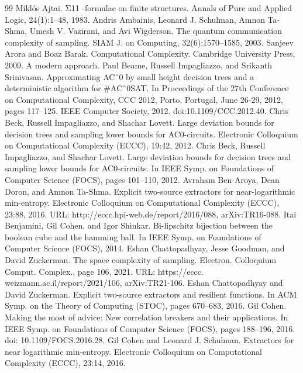 \documentclass[10pt,a4paper]{article}
\begin{document}
\begin{thebibliography}{99}
 Miklós Ajtai. Σ11 -formulae on finite structures. Annals of Pure and Applied Logic, 24(1):1–48, 1983.
 Andris Ambainis, Leonard J. Schulman, Amnon Ta-Shma, Umesh V. Vazirani, and Avi Wigderson. The quantum communication complexity of sampling. SIAM J. on Computing, 32(6):1570–1585, 2003.
 Sanjeev Arora and Boaz Barak. Computational Complexity. Cambridge University Press, 2009. A modern approach.
 Paul Beame, Russell Impagliazzo, and Srikanth Srinivasan. Approximating ACˆ0 by small height decision trees and a deterministic algorithm for \#ACˆ0SAT. In Proceedings of the 27th Conference on Computational Complexity, CCC 2012, Porto, Portugal, June 26-29, 2012, pages 117–125. IEEE Computer Society, 2012. doi:10.1109/CCC.2012.40.
 Chris Beck, Russell Impagliazzo, and Shachar Lovett. Large deviation bounds for decision trees and sampling lower bounds for AC0-circuits. Electronic Colloquium on Computational Complexity (ECCC), 19:42, 2012.
 Chris Beck, Russell Impagliazzo, and Shachar Lovett. Large deviation bounds for decision trees and sampling lower bounds for AC0-circuits. In IEEE Symp. on Foundations of Computer Science (FOCS), pages 101–110, 2012.
 Avraham Ben-Aroya, Dean Doron, and Amnon Ta-Shma. Explicit two-source extractors for near-logarithmic min-entropy. Electronic Colloquium on Computational Complexity (ECCC), 23:88, 2016. URL: http://eccc.hpi-web.de/report/2016/088, arXiv:TR16-088.
 Itai Benjamini, Gil Cohen, and Igor Shinkar. Bi-lipschitz bijection between the boolean cube and the hamming ball. In IEEE Symp. on Foundations of Computer Science (FOCS), 2014.
 Eshan Chattopadhyay, Jesse Goodman, and David Zuckerman. The space complexity of sampling. Electron. Colloquium Comput. Complex., page 106, 2021. URL: https://eccc. weizmann.ac.il/report/2021/106, arXiv:TR21-106.
 Eshan Chattopadhyay and David Zuckerman. Explicit two-source extractors and resilient functions. In ACM Symp. on the Theory of Computing (STOC), pages 670–683, 2016.
 Gil Cohen. Making the most of advice: New correlation breakers and their applications. In IEEE Symp. on Foundations of Computer Science (FOCS), pages 188–196, 2016. doi: 10.1109/FOCS.2016.28.
 Gil Cohen and Leonard J. Schulman. Extractors for near logarithmic min-entropy. Electronic Colloquium on Computational Complexity (ECCC), 23:14, 2016.

\end{thebibliography}
\end{document}
